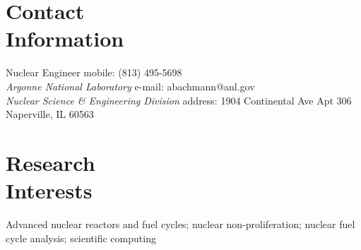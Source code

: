 \documentclass[margin,line]{resume}
\begin{document}
\begin{resume}



    \section{\mysidestyle Contact\\Information}
    Nuclear Engineer \hfill mobile: (813) 495-5698 \vspace{0mm}\\\vspace{0mm}%
    \textsl{Argonne National Laboratory} \hfill e-mail: abachmann@anl.gov \vspace{0mm}\\\vspace{0mm}%
        \textsl{Nuclear Science \& Engineering Division}
    \vspace{0mm} \hfill address: 1904 Continental Ave Apt 306 \\ \vspace{0mm} \hfill Naperville, IL 60563 \\\vspace{-4.5mm}%

    \section{\mysidestyle Research\\Interests}
                Advanced nuclear reactors and fuel cycles; 
                nuclear non-proliferation;
                nuclear fuel cycle analysis;
                scientific computing

\end{resume}
\end{document}
